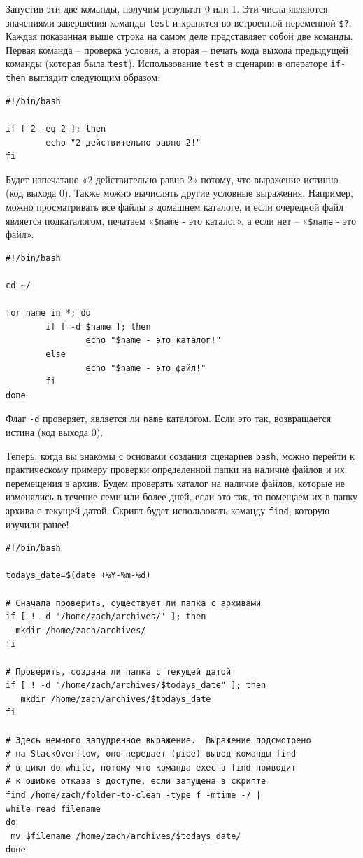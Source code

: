\documentclass[a4paper,12pt,final,openany]{extbook}
\begin{document}
Запустив эти две команды, получим результат 0 или 1. Эти числа являются
значениями завершения команды \texttt{test} и хранятся во встроенной переменной
\texttt{\$?}. Каждая показанная выше строка на самом деле представляет
собой две команды. Первая команда -- проверка условия, а вторая -- печать
кода выхода предыдущей команды (которая была \texttt{test}). Использование \texttt{test} в
сценарии в операторе \texttt{if-then} выглядит следующим образом:
\begin{verbatim}
#!/bin/bash

if [ 2 -eq 2 ]; then
        echo "2 действительно равно 2!"
fi
\end{verbatim}

Будет напечатано «2 действительно равно 2» потому, что выражение истинно
(код выхода 0). Также можно вычислять другие условные выражения.
Например, можно просматривать все файлы в домашнем каталоге, и если
очередной файл является подкаталогом, печатаем «\texttt{\$name} - это каталог», а
если нет -- «\texttt{\$name} - это файл».

\begin{verbatim}
#!/bin/bash

cd ~/

for name in *; do
        if [ -d $name ]; then
                echo "$name - это каталог!"
        else
                echo "$name - это файл!"
        fi
done
\end{verbatim}

Флаг \texttt{-d} проверяет, является ли \texttt{name} каталогом. Если это так,
возвращается истина (код выхода 0).

Теперь, когда вы знакомы с основами создания сценариев \texttt{bash}, можно
перейти к практическому примеру проверки определенной папки на наличие
файлов и их перемещения в архив. Будем проверять каталог на наличие
файлов, которые не изменялись в течение семи или более дней, если это
так, то помещаем их в папку архива с текущей датой. Скрипт будет
использовать команду \texttt{find}, которую изучили ранее!
\begin{verbatim}
#!/bin/bash

todays_date=$(date +%Y-%m-%d)

# Сначала проверить, существует ли папка с архивами
if [ ! -d '/home/zach/archives/' ]; then
  mkdir /home/zach/archives/
fi

# Проверить, создана ли папка с текущей датой
if [ ! -d "/home/zach/archives/$todays_date" ]; then
   mkdir /home/zach/archives/$todays_date
fi

# Здесь немного запудренное выражение.  Выражение подсмотрено
# на StackOverflow, оно передает (pipe) вывод команды find
# в цикл do-while, потому что команда exec в find приводит
# к ошибке отказа в доступе, если запущена в скрипте
find /home/zach/folder-to-clean -type f -mtime -7 |
while read filename
do
 mv $filename /home/zach/archives/$todays_date/
done
\end{verbatim}
\end{document}
